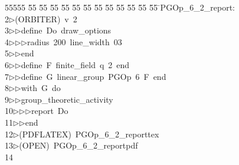 %
%
\begin{tabbing}
55555 \= 55 \= 55 \= 55 \= 55 \= 55 \= 55 \= 55 \= 55 \= 55 \= 55 \= 55 \= 55 \= \>PGOp\_6\_2\_report:\\[0pt]
2\>$\triangleright$\>(ORBITER)\ v\ 2\ \\[0pt]
3\>$\triangleright$\>$\triangleright$\>define\ Do\ draw\_options\ \\[0pt]
4\>$\triangleright$\>$\triangleright$\>$\triangleright$\>radius\ 200\ line\_width\ 03\ \\[0pt]
5\>$\triangleright$\>$\triangleright$\>end\ \\[0pt]
6\>$\triangleright$\>$\triangleright$\>define\ F\ finite\_field\ q\ 2\ end\ \\[0pt]
7\>$\triangleright$\>$\triangleright$\>define\ G\ linear\_group\ PGOp\ 6\ F\ end\ \\[0pt]
8\>$\triangleright$\>$\triangleright$\>with\ G\ do\ \\[0pt]
9\>$\triangleright$\>$\triangleright$\>group\_theoretic\_activity\ \\[0pt]
10\>$\triangleright$\>$\triangleright$\>$\triangleright$\>report\ Do\ \\[0pt]
11\>$\triangleright$\>$\triangleright$\>end\\[0pt]
12\>$\triangleright$\>(PDFLATEX)\ PGOp\_6\_2\_reporttex\\[0pt]
13\>$\triangleright$\>(OPEN)\ PGOp\_6\_2\_reportpdf\\[0pt]
14\>\end{tabbing}
